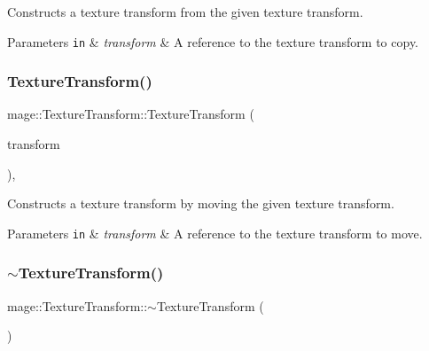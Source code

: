 Constructs a texture transform from the given texture transform.


\begin{DoxyParams}[1]{Parameters}
\mbox{\tt in}  & {\em transform} & A reference to the texture transform to copy. \\
\hline
\end{DoxyParams}
\hypertarget{classmage_1_1_texture_transform_a37e8d4155e7c2bd4e8ebf282c855e2ae}{}\label{classmage_1_1_texture_transform_a37e8d4155e7c2bd4e8ebf282c855e2ae} 
\subsubsection{\texorpdfstring{Texture\+Transform()}{TextureTransform()}\hspace{0.1cm}{\footnotesize\ttfamily [4/4]}}
{\footnotesize\ttfamily mage\+::\+Texture\+Transform\+::\+Texture\+Transform (\begin{DoxyParamCaption}\item[{\hyperlink{classmage_1_1_texture_transform}{Texture\+Transform} \&\&}]{transform }\end{DoxyParamCaption})\hspace{0.3cm}{\ttfamily [default]}, {\ttfamily [noexcept]}}

Constructs a texture transform by moving the given texture transform.


\begin{DoxyParams}[1]{Parameters}
\mbox{\tt in}  & {\em transform} & A reference to the texture transform to move. \\
\hline
\end{DoxyParams}
\hypertarget{classmage_1_1_texture_transform_afb608ccc7bc107b893ea68937529a901}{}\label{classmage_1_1_texture_transform_afb608ccc7bc107b893ea68937529a901} 
\subsubsection{\texorpdfstring{$\sim$\+Texture\+Transform()}{~TextureTransform()}}
{\footnotesize\ttfamily mage\+::\+Texture\+Transform\+::$\sim$\+Texture\+Transform (\begin{DoxyParamCaption}{ }\end{DoxyParamCaption})\hspace{0.3cm}{\ttfamily [default]}}

